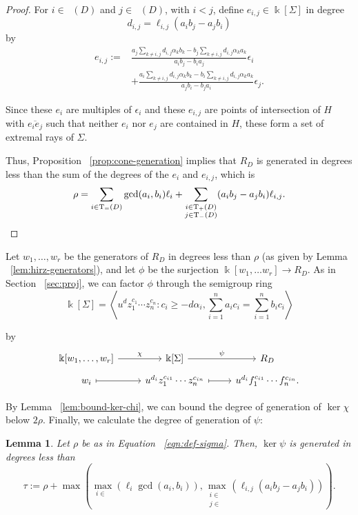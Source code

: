 \documentclass{amsart}
\theoremstyle{plain}
\newtheorem{lem}[thm]{Lemma}
\theoremstyle{definition}
\theoremstyle{remark}
\numberwithin{equation}{section}
\newcommand\bk{{\Bbbk}}
\newcommand\bida{a}
\newcommand\bidb{b}
\DeclareMathOperator{\Te}{T_=}
\DeclareMathOperator{\Tp}{T_+}
\DeclareMathOperator{\Tm}{T_-}
\begin{document}
\begin{proof}
\noindent
For $i \in \Tp(D)$ and $j \in \Tm(D)$, with $i < j$, define $e_{i,j}\in \bk[\Sigma]$ in degree 
\[
	d_{i,j} = \ell_{i, j}(\bida_i \bidb_j - \bida_j \bidb_i)
\]
by
\begin{align*}
e_{i,j} := &\frac{a_j\sum_{k\ne i,j} d_{i,j}\alpha_k b_k - b_j\sum_{k \ne i,j} d_{i,j} \alpha_k a_k}{a_ib_j - b_i a_j} \epsilon_i \\
&+ \frac{a_i \sum_{k\ne i,j} d_{i,j} \alpha_k b_k - b_i\sum_{k\ne i,j} d_{i,j} \alpha_ka_k}{a_jb_i - b_j a_i} \epsilon_j.
\end{align*}

Since these $e_i$ are multiples of $\epsilon_i$ and these
$e_{i,j}$ are points of intersection of $H$ with
$\overline {e_ie_j}$ such that neither $e_i$ nor $e_j$
are contained in $H$, these form a set of extremal rays of $\Sigma$.

Thus, Proposition ~\ref{prop:cone-generation} implies that 
$R_D$ is generated in 
degrees less than the sum of the degrees of the $e_i$ and $e_{i,j}$, which is
\[
	\rho = \sum_{i\in \Te(D)} \gcd(\bida_i, \bidb_i)\ell_i + \sum_{\substack{
	i \in \Tp(D) \\	j \in \Tm(D)}} (\bida_i \bidb_j- \bida_j \bidb_i)\ell_{i,j}.
\qedhere
\]\end{proof}

Let $w_1, \ldots, w_r$ be the generators of $R_D$ in degrees less than $\rho$
(as given by Lemma ~\ref{lem:hirz-generators}), and let $\phi$ be the
surjection $\bk[w_1, \ldots w_r] \to R_D$. As in Section ~\ref{sec:proj}, we can factor $\phi$ through the
semigroup ring 
\[
	\bk[\Sigma] = \left \langle u^d z_1^{c_1} \cdots z_n^{c_n} \colon c_i \geq -d
	\alpha_i, \sum_{i=1}^{n} \bida_i c_i = \sum_{i=1}^{n} \bidb_i c_i
	\right \rangle
\]

\noindent
by
\[
\begin{tikzcd}[row sep = tiny]
	\bk[w_1,\ldots, w_r] \ar {r}{\chi} & \bk[\Sigma] \ar {r}{\psi} & R_D \\
	w_i \ar[mapsto]{r} & u^{d_i}z_1^{c_{i1}} \cdots z_n^{c_{in}} \ar[mapsto]{r} & u^{d_i}f_1^{c_{i1}} \cdots f_n^{c_{in}}.
\end{tikzcd}
\]

By Lemma ~\ref{lem:bound-ker-chi}, we can bound the degree of generation of $\ker \chi$ below
$2 \rho$.
Finally, we calculate the degree of generation of $\psi$:

\begin{lem}
\label{lem:hirz-bound-ker-psi}
Let $\rho$ be as in Equation ~\eqref{eqn:def-sigma}. Then, $\ker \psi$ is generated in degrees less than
\[
	\tau := \rho
	+ \max \left(\max_{i\in \Te}(\ell_i \gcd(a_i, b_i)), \max_{\substack{
	i \in	\Tp \\ j\in \Tm}} (\ell_{i,j} (\bida_i \bidb_j - \bida_j \bidb_i))
	\right).
\]
\end{lem}
\end{document}
